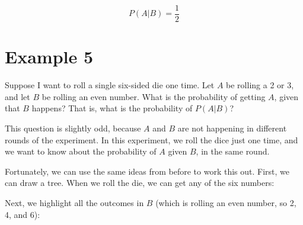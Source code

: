 \documentclass[../../../main.tex]{subfiles}
\begin{document}
\begin{equation*}
  P(A | B) = \frac{1}{2}
\end{equation*}


\section{Example 5}

Suppose I want to roll a single six-sided die one time. Let $A$ be rolling a 2 or 3, and let $B$ be rolling an even number. What is the probability of getting $A$, given that $B$ happens? That is, what is the probability of $P(A | B)$?

This question is slightly odd, because $A$ and $B$ are not happening in different rounds of the experiment. In this experiment, we roll the dice just one time, and we want to know about the probability of $A$ given $B$, in the same round.

Fortunately, we can use the same ideas from before to work this out. First, we can draw a tree. When we roll the die, we can get any of the six numbers:

\begin{center}
\end{center}

\noindent
Next, we highlight all the outcomes in $B$ (which is rolling an even number, so 2, 4, and 6):
\end{document}
